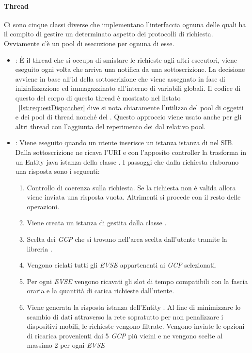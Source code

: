 \paragraph{Thread}

Ci sono cinque classi diverse che implementano l'interfaccia  ognuna delle quali ha il compito di gestire un determinato aspetto dei protocolli di richiesta. Ovviamente c'è un pool di esecuzione per ognuna di esse.

\begin{itemize}
	\item {}: È il thread che si occupa di smistare le richieste agli altri esecutori, viene eseguito ogni volta che arriva una notifica da una sottoscrizione. La decisione avviene in base all'id della sottoscrizione che viene assegnato in fase di inizializzazione ed immagazzinato all'interno di variabili globali. Il codice di questo del corpo di questo thread è mostrato nel listato ~\ref{lst:requestDispatcher} dive si nota chiaramente l'utilizzo del pool di oggetti e dei pool di thread nonché del . Questo approccio viene usato anche per gli altri thread con l'aggiunta del reperimento dei  dal relativo pool.
	\item {}: Viene eseguito quando un utente inserisce un istanza istanza di  nel SIB. Dalla sottoscrizione ne ricava l'URI e con l'apposito controller  la trasforma in un Entity java istanza della classe . I passaggi che dalla richiesta elaborano una risposta sono i seguenti:
	\begin{enumerate}
		\item Controllo di coerenza sulla richiesta. Se la richiesta non è valida allora viene inviata una risposta vuota. Altrimenti si procede con il resto delle operazioni.
		\item Viene creata un istanza di  gestita dalla classe .
		\item Scelta dei \emph{GCP} che si trovano nell'area scelta dall'utente tramite la libreria .
		\item Vengono ciclati tutti gli \emph{EVSE} appartenenti ai \emph{GCP} selezionati.
		\item Per ogni \emph{EVSE} vengono ricavati gli slot di tempo compatibili con la fascia oraria e la quantità di carica richieste dall'utente.
		\item Viene generata la risposta istanza dell'Entity . Al fine di minimizzare lo scambio di dati attraverso la rete sopratutto per non penalizzare i dispositivi mobili, le richieste vengono filtrate. Vengono inviate le opzioni di ricarica provenienti dai 5 \emph{GCP} più vicini e ne vengono scelte al massimo 2 per ogni \emph{EVSE}

\end{enumerate}
\end{itemize}
